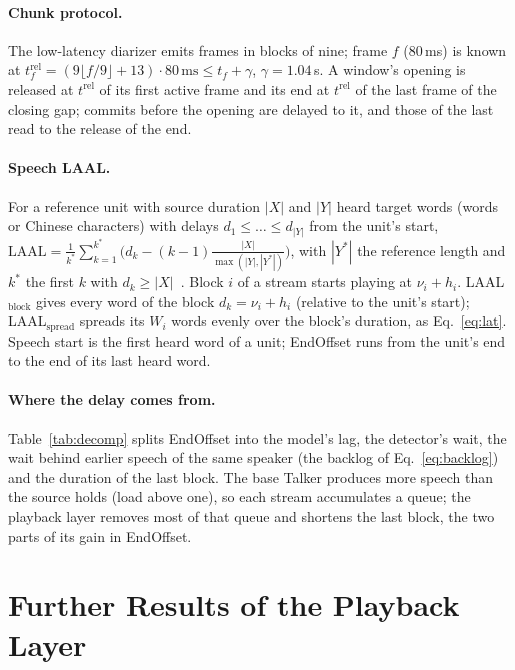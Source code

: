 \paragraph{Chunk protocol.} The low-latency diarizer emits frames in blocks of nine; frame $f$ (80\,ms) is known at
$t^{\mathrm{rel}}_f=(9\lfloor f/9\rfloor+13)\cdot 80\,\text{ms}\le t_f+\gamma$, $\gamma=1.04$\,s. A window's opening is
released at $t^{\mathrm{rel}}$ of its first active frame and its end at $t^{\mathrm{rel}}$ of the last frame of the
closing gap; commits before the opening are delayed to it, and those of the last read to the release of the end.

\paragraph{Speech LAAL.} For a reference unit with source duration $|X|$ and $|Y|$ heard target words (words or Chinese
characters) with delays $d_1\le\dots\le d_{|Y|}$ from the unit's start,
$\mathrm{LAAL}=\frac{1}{k^\ast}\sum_{k=1}^{k^\ast}\big(d_k-(k-1)\frac{|X|}{\max(|Y|,|Y^\ast|)}\big)$, with $|Y^\ast|$ the
reference length and $k^\ast$ the first $k$ with $d_k\ge|X|$~\citep{papi2022over}. Block $i$ of a stream starts playing
at $\nu_i+h_i$. LAAL$_\text{block}$ gives every word of the block $d_k=\nu_i+h_i$ (relative to the unit's start);
LAAL$_\text{spread}$ spreads its $W_i$ words evenly over the block's duration, as Eq.~\eqref{eq:lat}. Speech start is the
first heard word of a unit; EndOffset runs from the unit's end to the end of its last heard word.

\paragraph{Where the delay comes from.} Table~\ref{tab:decomp} splits EndOffset into the model's lag, the detector's
wait, the wait behind earlier speech of the same speaker (the backlog of Eq.~\eqref{eq:backlog}) and the duration of the
last block. The base Talker produces more speech than the source holds (load above one), so each stream accumulates a
queue; the playback layer removes most of that queue and shortens the last block, the two parts of its gain in
EndOffset.



\section{Further Results of the Playback Layer}
\label{app:sig10}
\label{app:postreview}

